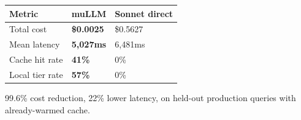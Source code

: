 {\def\LTcaptype{none} %
\begin{longtable}[]{@{}lll@{}}
\toprule\noalign{}
Metric & muLLM & Sonnet direct \\
\midrule\noalign{}
\endhead
\bottomrule\noalign{}
\endlastfoot
Total cost & \textbf{\$0.0025} & \$0.5627 \\
Mean latency & \textbf{5,027ms} & 6,481ms \\
Cache hit rate & \textbf{41\%} & 0\% \\
Local tier rate & \textbf{57\%} & 0\% \\
\end{longtable}
}

99.6\% cost reduction, 22\% lower latency, on held-out production queries with already-warmed cache.
